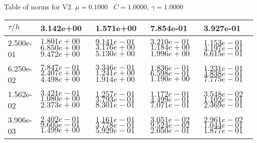 \begin{center}
Table of norms for V2. $\mu = 0.1000$ \, $C = 1.0000$, $\gamma = 1.0000$
  
\begin{tabular}{|p{1in}|p{1in}|p{1in}|p{1in}|p{1in}|} \hline
$\tau / h$ &3.142e+00 &1.571e+00 &7.854e-01 &3.927e-01 \\ \hline 
2.500e-01 & $1.801e+00$  $6.850e+00$  $9.472e+00$  & $9.141e-01$  $3.176e+00$  $5.130e+00$  & $3.210e-01$  $1.184e+00$  $1.996e+00$  & $1.153e-01$  $4.197e-01$  $6.615e-01$  \\ \hline 
6.250e-02 & $7.847e-01$  $2.407e+00$  $4.498e+00$  & $3.346e-01$  $1.241e+00$  $1.914e+00$  & $1.836e-01$  $6.598e-01$  $1.190e+00$  & $1.231e-01$  $4.838e-01$  $7.775e-01$  \\ \hline 
1.562e-02 & $3.421e-01$  $1.080e+00$  $2.373e+00$  & $1.257e-01$  $3.793e-01$  $8.301e-01$  & $1.172e-01$  $4.499e-01$  $7.071e-01$  & $3.548e-02$  $1.102e-01$  $2.369e-01$  \\ \hline 
3.906e-03 & $2.402e-01$  $9.605e-01$  $1.499e+00$  & $1.161e-01$  $3.778e-01$  $5.929e-01$  & $3.051e-02$  $9.524e-02$  $2.050e-01$  & $2.961e-02$  $1.044e-01$  $1.877e-01$  \\ \hline 

\end{tabular}\\[20pt]
\end{center}
